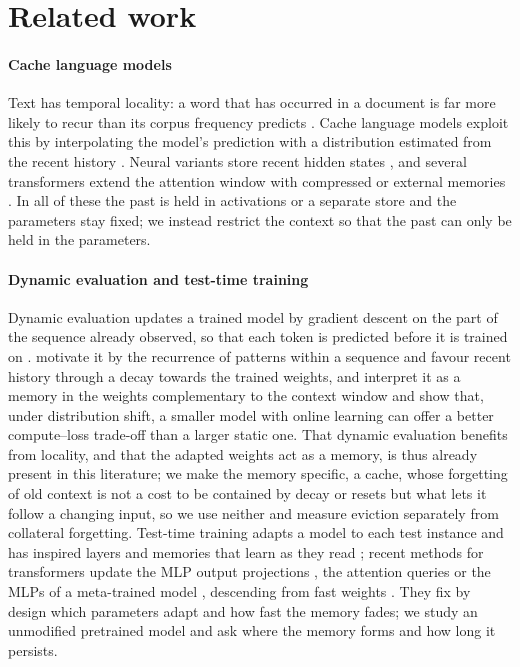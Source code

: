 \documentclass[times,twocolumn,final,authoryear]{elsarticle}
\begin{document}
\section{Related work}

\paragraph{Cache language models}
Text has temporal locality: a word that has occurred in a document is far more likely to recur than its corpus frequency predicts \citep{church2000empirical}.
Cache language models exploit this by interpolating the model's prediction with a distribution estimated from the recent history \citep{kuhn1990cache}.
Neural variants store recent hidden states \citep{grave2017improving}, and several transformers extend the attention window with compressed or external memories \citep{rae2020compressive,wu2022memorizing}.
In all of these the past is held in activations or a separate store and the parameters stay fixed; we instead restrict the context so that the past can only be held in the parameters.

\paragraph{Dynamic evaluation and test-time training}
Dynamic evaluation updates a trained model by gradient descent on the part of the sequence already observed, so that each token is predicted before it is trained on \citep{mikolov2010recurrent}.
\citet{krause2018dynamic,krause2019dynamic} motivate it by the recurrence of patterns within a sequence and favour recent history through a decay towards the trained weights, and \citet{rannentriki2024revisiting} interpret it as a memory in the weights complementary to the context window and show that, under distribution shift, a smaller model with online learning can offer a better compute--loss trade-off than a larger static one.
That dynamic evaluation benefits from locality, and that the adapted weights act as a memory, is thus already present in this literature; we make the memory specific, a cache, whose forgetting of old context is not a cost to be contained by decay or resets but what lets it follow a changing input, so we use neither and measure eviction separately from collateral forgetting.
Test-time training adapts a model to each test instance \citep{sun2020test} and has inspired layers and memories that learn as they read \citep{behrouz2024titans}; recent methods for transformers update the MLP output projections \citep{feng2026inplace}, the attention queries \citep{bansal2026lets} or the MLPs of a meta-trained model \citep{tandon2025endtoend}, descending from fast weights \citep{hinton1987using,ba2016using}.
They fix by design which parameters adapt and how fast the memory fades; we study an unmodified pretrained model and ask where the memory forms and how long it persists.
\end{document}
